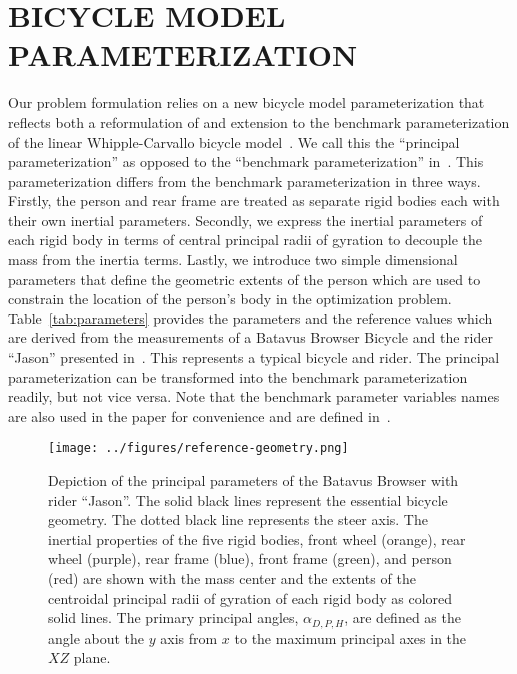 \documentclass{bmd2019p}
\begin{document}
\section{BICYCLE MODEL PARAMETERIZATION}
%
Our problem formulation relies on a new bicycle model parameterization that
reflects both a reformulation of and extension to the benchmark
parameterization of the linear Whipple-Carvallo bicycle
model~\cite{Meijaard2007}. We call this the ``principal parameterization'' as
opposed to the ``benchmark parameterization'' in~\cite{Meijaard2007}. This
parameterization differs from the benchmark parameterization in three ways.
Firstly, the person and rear frame are treated as separate rigid bodies each
with their own inertial parameters. Secondly, we express the inertial
parameters of each rigid body in terms of central principal radii of gyration
to decouple the mass from the inertia terms. Lastly, we introduce two simple
dimensional parameters that define the geometric extents of the person which
are used to constrain the location of the person's body in the optimization
problem. Table~\ref{tab:parameters} provides the parameters and the reference
values which are derived from the measurements of a Batavus Browser Bicycle and
the rider ``Jason'' presented in~\cite{Moore2012}. This represents a typical
bicycle and rider. The principal parameterization can be transformed into the
benchmark parameterization readily, but not vice versa. Note that the benchmark
parameter variables names are also used in the paper for convenience and are
defined in~\cite{Meijaard2007}.
%
\begin{figure}
  \centering
  \texttt{[image: ../figures/reference-geometry.png]}
  \caption{Depiction of the principal parameters of the Batavus Browser
    with rider ``Jason''. The solid black lines represent the essential bicycle
    geometry. The dotted black line represents the steer axis. The inertial
    properties of the five rigid bodies, front wheel (orange), rear wheel
    (purple), rear frame (blue), front frame (green), and person (red) are
    shown with the mass center and the extents of the centroidal principal
    radii of gyration of each rigid body as colored solid lines. The primary
    principal angles, $\alpha_{D,P,H}$, are defined as the angle about the $y$
    axis from $x$ to the maximum principal axes in the $XZ$ plane.}
\end{figure}
%
\end{document}
